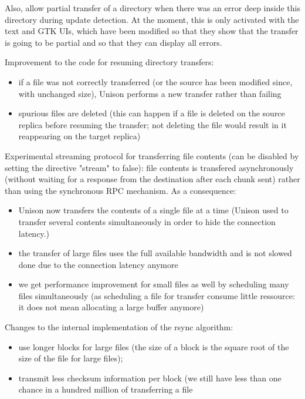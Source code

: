 \begin{changesfromversion}{2.32}
  Also, allow partial transfer of a directory when there was an error deep
  inside this directory during update detection.  At the moment, this
  is only activated with the text and GTK UIs, which have been
  modified so that they show that the transfer is going to be partial
  and so that they can display all errors.
\item Improvement to the code for resuming directory transfers:
\begin{itemize}
\item
   if a file was not correctly transferred (or the source has been
    modified since, with unchanged size), Unison performs a new
    transfer rather than failing
  \item spurious files are deleted (this can happen if a file is deleted
    on the source replica before resuming the transfer; not deleting
    the file would result in it reappearing on the target replica)
\end{itemize}
\item Experimental streaming protocol for transferring file contents (can
  be disabled by setting the directive "stream" to false): file
  contents is transfered asynchronously (without waiting for a response
  from the destination after each chunk sent) rather than using the
  synchronous RPC mechanism.  As a consequence:
  \begin{itemize}
  \item
   Unison now transfers the contents of a single file at a time
    (Unison used to transfer several contents simultaneously in order
    to hide the connection latency.)
  \item the transfer of large files uses the full available bandwidth
    and is not slowed done due to the connection latency anymore
  \item we get performance improvement for small files as well by
    scheduling many files simultaneously (as scheduling a file for
    transfer consume little ressource: it does not mean allocating a
    large buffer anymore)
  \end{itemize}
\item Changes to the internal implementation of the rsync algorithm:
\begin{itemize}
\item
  use longer blocks for large files (the size of a block is the
    square root of the size of the file for large files);
  \item transmit less checksum information per block (we still have less
    than one chance in a hundred million of transferring a file

\end{itemize}
\end{changesfromversion}
